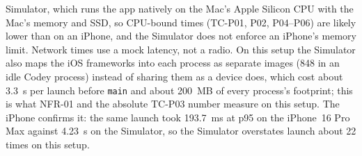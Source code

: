 \documentclass[12pt,letterpaper]{article}
\begin{document}
\begin{itemize}
        Simulator, which runs the app natively on the Mac's Apple Silicon CPU with the
        Mac's memory and SSD, so CPU-bound times (TC-P01, P02, P04--P06) are likely
        lower than on an iPhone, and the Simulator does not enforce an iPhone's memory
        limit. Network times use a mock latency, not a radio. On this setup the
        Simulator also maps the iOS frameworks into each process as separate images
        (848 in an idle Codey process) instead of sharing them as a device does,
        which cost about 3.3~s per launch before \texttt{main} and about 200~MB of
        every process's footprint; this is what NFR-01 and the absolute TC-P03
        number measure on this setup. The iPhone confirms it: the same launch
        took 193.7~ms at p95 on the iPhone~16 Pro Max against 4.23~s on the
        Simulator, so the Simulator overstates launch about 22 times on this setup.
\end{itemize}
\end{document}
